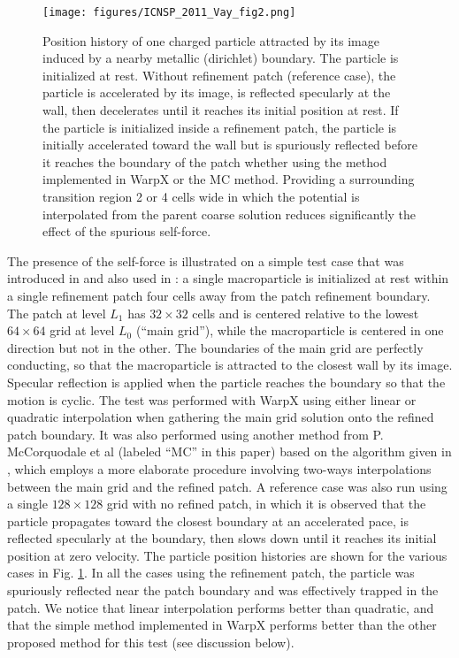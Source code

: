 \begin{figure}[htb]
  \centering
  \texttt{[image: figures/ICNSP\_2011\_Vay\_fig2.png]}
  \caption{Position history of one charged particle attracted by its image induced by a nearby metallic (dirichlet) boundary. The particle is initialized at rest. Without refinement patch (reference case), the particle is accelerated by its image, is reflected specularly at the wall, then decelerates until it reaches its initial position at rest. If the particle is initialized inside a refinement patch, the particle is initially accelerated toward the wall but is spuriously reflected before it reaches the boundary of the patch whether using the method implemented in WarpX or the MC method. Providing a surrounding transition region 2 or 4 cells wide in which the potential is interpolated from the parent coarse solution reduces significantly the effect of the spurious self-force. }
  \label{fig:ESselfforce}
\end{figure}
The presence of the self-force is illustrated on a simple test case that was introduced in \cite{Vaylpb2002} and also used in \cite{Colellajcp2010}: a single macroparticle is initialized at rest within a single refinement patch four cells away from the patch refinement boundary. The patch at level $L_1$ has $32\times32$ cells and is centered relative to the lowest $64\times64$ grid at level $L_0$ (``main grid''), while the macroparticle is centered in one direction but not in the other. The boundaries of the main grid are perfectly conducting, so that the macroparticle is attracted to the closest wall by its image. Specular reflection is applied when the particle reaches the boundary so that the motion is cyclic. The test was performed with WarpX using either linear or quadratic interpolation when gathering the main grid solution onto the refined patch boundary. It was also performed using another method from P. McCorquodale et al (labeled ``MC'' in this paper) based on the algorithm given in \cite{Mccorquodalejcp2004}, which employs a more elaborate procedure involving two-ways interpolations between the main grid and the refined patch. A reference case was also run using a single $128\times128$ grid with no refined patch, in which it is observed that the particle propagates toward the closest boundary at an accelerated pace, is reflected specularly at the boundary, then slows down until it reaches its initial position at zero velocity. The particle position histories are shown for the various cases in Fig. \ref{fig:ESselfforce}. In all the cases using the refinement patch, the particle was spuriously reflected near the patch boundary and was effectively trapped in the patch. We notice that linear interpolation performs better than quadratic, and that the simple method implemented in WarpX performs better than the other proposed method for this test (see discussion below). 

